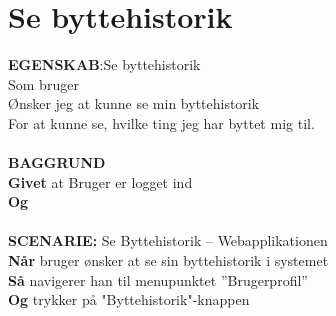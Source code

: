\section{Se byttehistorik}
{\color{blue}\textbf{EGENSKAB}:}Se byttehistorik \\
Som bruger \\
Ønsker jeg at kunne se min byttehistorik \\
For at kunne se, hvilke ting jeg har byttet mig til.\\ \\
{\color{blue}\textbf{BAGGRUND}} \\
{\color{blue}\textbf{Givet}} at Bruger er logget ind \\
{\color{blue}\textbf{Og}} \\\\
{\color{blue}\textbf{SCENARIE:}} Se Byttehistorik – Webapplikationen \\
{\color{blue}\textbf{Når}} bruger ønsker at se sin byttehistorik i systemet\\
{\color{blue}\textbf{Så}} navigerer han til menupunktet ”Brugerprofil” \\
{\color{blue}\textbf{Og}} trykker på "Byttehistorik"-knappen
